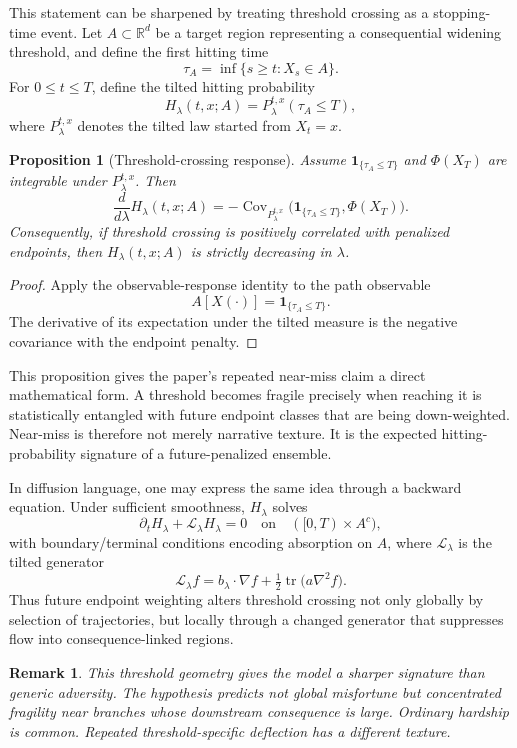 \documentclass[12pt]{article}
\newtheorem{proposition}{Proposition}
\newtheorem{remark}{Remark}
\begin{document}
This statement can be sharpened by treating threshold crossing as a stopping-time event. Let $A \subset \mathbb R^d$ be a target region representing a consequential widening threshold, and define the first hitting time
\[
\tau_A = \inf\{s \ge t : X_s \in A\}.
\]
For $0 \le t \le T$, define the tilted hitting probability
\[
H_\lambda(t,x;A) = P_\lambda^{t,x}(\tau_A \le T),
\]
where $P_\lambda^{t,x}$ denotes the tilted law started from $X_t=x$.

\begin{proposition}[Threshold-crossing response]
Assume $\mathbf 1_{\{\tau_A\le T\}}$ and $\Phi(X_T)$ are integrable under $P_\lambda^{t,x}$. Then
\[
\frac{d}{d\lambda}H_\lambda(t,x;A)
= -\operatorname{Cov}_{P_\lambda^{t,x}}\!\bigl(\mathbf 1_{\{\tau_A\le T\}},\Phi(X_T)\bigr).
\]
Consequently, if threshold crossing is positively correlated with penalized endpoints, then $H_\lambda(t,x;A)$ is strictly decreasing in $\lambda$.
\end{proposition}

\begin{proof}
Apply the observable-response identity to the path observable
\[
A[X(\cdot)] = \mathbf 1_{\{\tau_A\le T\}}.
\]
The derivative of its expectation under the tilted measure is the negative covariance with the endpoint penalty.
\end{proof}

This proposition gives the paper's repeated near-miss claim a direct mathematical form. A threshold becomes fragile precisely when reaching it is statistically entangled with future endpoint classes that are being down-weighted. Near-miss is therefore not merely narrative texture. It is the expected hitting-probability signature of a future-penalized ensemble.

In diffusion language, one may express the same idea through a backward equation. Under sufficient smoothness, $H_\lambda$ solves
\[
\partial_t H_\lambda + \mathcal L_\lambda H_\lambda = 0
\quad\text{on}\quad ([0,T)\times A^c),
\]
with boundary/terminal conditions encoding absorption on $A$, where $\mathcal L_\lambda$ is the tilted generator
\[
\mathcal L_\lambda f = b_\lambda \cdot \nabla f + \tfrac12 \operatorname{tr}\!\bigl(a\nabla^2 f\bigr).
\]
Thus future endpoint weighting alters threshold crossing not only globally by selection of trajectories, but locally through a changed generator that suppresses flow into consequence-linked regions.

\begin{remark}
This threshold geometry gives the model a sharper signature than generic adversity. The hypothesis predicts not global misfortune but concentrated fragility near branches whose downstream consequence is large. Ordinary hardship is common. Repeated threshold-specific deflection has a different texture.
\end{remark}
\end{document}
